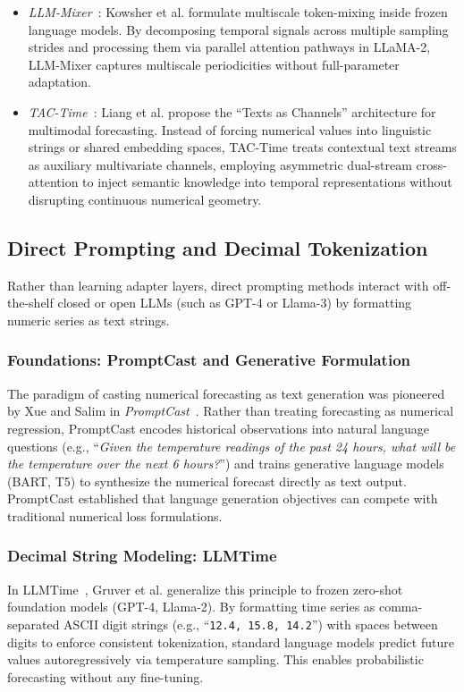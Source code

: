 \begin{itemize}[leftmargin=*]
    \item \emph{LLM-Mixer}~\cite{kowsher2024llmmixer}: Kowsher et al. formulate multiscale token-mixing inside frozen language models. By decomposing temporal signals across multiple sampling strides and processing them via parallel attention pathways in LLaMA-2, LLM-Mixer captures multiscale periodicities without full-parameter adaptation.
    \item \emph{TAC-Time}~\cite{liang2026tactime}: Liang et al. propose the ``Texts as Channels'' architecture for multimodal forecasting. Instead of forcing numerical values into linguistic strings or shared embedding spaces, TAC-Time treats contextual text streams as auxiliary multivariate channels, employing asymmetric dual-stream cross-attention to inject semantic knowledge into temporal representations without disrupting continuous numerical geometry.
\end{itemize}

\subsection{Direct Prompting and Decimal Tokenization}

Rather than learning adapter layers, direct prompting methods interact with off-the-shelf closed or open LLMs (such as GPT-4 or Llama-3) by formatting numeric series as text strings.

\subsubsection{Foundations: PromptCast and Generative Formulation}
The paradigm of casting numerical forecasting as text generation was pioneered by Xue and Salim in \emph{PromptCast}~\cite{xue2022promptcast}. Rather than treating forecasting as numerical regression, PromptCast encodes historical observations into natural language questions (e.g., ``\emph{Given the temperature readings of the past 24 hours, what will be the temperature over the next 6 hours?}'') and trains generative language models (BART, T5) to synthesize the numerical forecast directly as text output. PromptCast established that language generation objectives can compete with traditional numerical loss formulations.

\subsubsection{Decimal String Modeling: LLMTime}
In LLMTime~\cite{gruver2023llmtime}, Gruver et al. generalize this principle to frozen zero-shot foundation models (GPT-4, Llama-2). By formatting time series as comma-separated ASCII digit strings (e.g., ``\texttt{12.4, 15.8, 14.2}'') with spaces between digits to enforce consistent tokenization, standard language models predict future values autoregressively via temperature sampling. This enables probabilistic forecasting without any fine-tuning.


